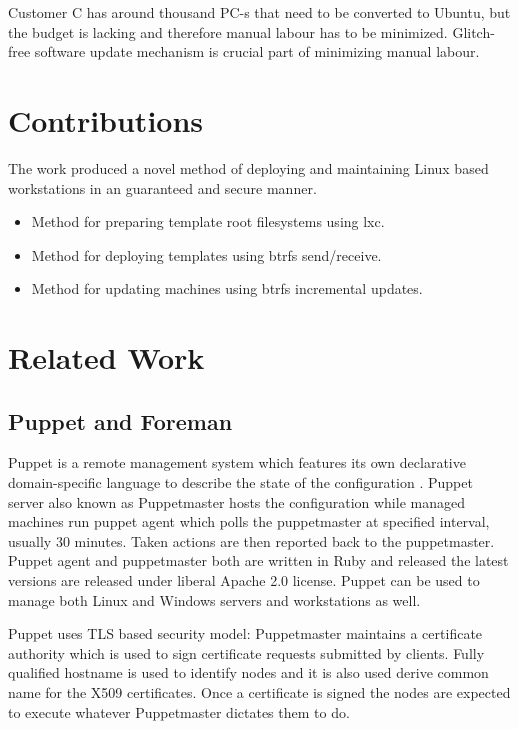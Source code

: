 \documentclass[a4paper,11pt]{kth-mag}
\begin{document}
Customer C has around thousand PC-s that need to be converted to Ubuntu,
but the budget is lacking and therefore manual labour has to be minimized.
Glitch-free software update mechanism is crucial part of minimizing manual
labour.

\section{Contributions}

The work produced a novel method of deploying and maintaining Linux
based workstations in an guaranteed and secure manner.

\begin{itemize}
\item Method for preparing template root filesystems using \acrshort{lxc}.
\item Method for deploying templates using \acrshort{btrfs} send/receive.
\item Method for updating machines using \acrshort{btrfs} incremental updates.
\end{itemize}


\section{Related Work}
\label{sec:related}

\subsection{Puppet and Foreman}

Puppet is a remote management system which features its own declarative
domain-specific language to describe the state of the configuration
\cite{puppet}. Puppet server also known as Puppetmaster
hosts the configuration while managed machines run puppet agent which polls
the puppetmaster at specified interval, usually 30 minutes. Taken actions
are then reported back to the puppetmaster. Puppet agent and puppetmaster
both are written in Ruby and released the latest versions are released under
liberal Apache 2.0 license. Puppet can be used to manage both Linux and
Windows servers and workstations as well.

Puppet uses TLS based security model:
Puppetmaster maintains a certificate authority which is used
to sign certificate requests submitted by clients.
Fully qualified hostname is used to identify nodes and
it is also used derive common name for the X509 certificates.
Once a certificate is signed the nodes are expected to
execute whatever Puppetmaster dictates them to do.
\end{document}
